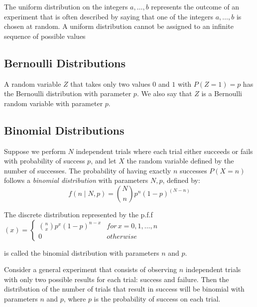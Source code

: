 {\color{red} The uniform distribution on the integers $a, \ldots, b$ represents the outcome of an experiment that is often described by saying that one of the integers $a, \ldots, b$ is chosen at random. A uniform distribution cannot be assigned to an infinite sequence of possible values}


\subsection{Bernoulli Distributions}

\begin{example}
A random variable $Z$ that takes only two values $0$ and $1$ with $P\left(Z=1\right)=p$ has the Bernoulli distribution with parameter $p$. We also say that $Z$ is a Bernoulli random variable with parameter $p$.
\end{example}

\subsection{Binomial Distributions}

\begin{example}
Suppose we perform $N$ independent trials where each trial either succeeds or fails with probability of success $p$, and let $X$ the random variable defined by the number of successes. The probability of having exactly $n$ successes $P(X=n)$ follows a \emph{binomial distribution} with parameters $N, p$, defined by:
\[
f(n\mid N, p) = \binom{N}{n} p^n (1-p)^{(N-n)}
\]
\end{example}

\begin{definition}
The discrete distribution represented by the p.f.f $\left(x\right)=\begin{cases}
{n \choose x}p^{x}\left(1-p\right)^{n-x} & for\,x=0,1,\ldots,n\\
0 & otherwise
\end{cases}$
\end{definition}

{\color{red} is called the binomial distribution with parameters $n$ and $p$.}

{\color{red} Consider a general experiment that consists of observing $n$ independent trials with only two possible results for each trial: success and failure. Then the distribution of the number of trials that result in success will be binomial with parameters $n$ and $p$, where $p$ is the probability of success on each trial.} 



